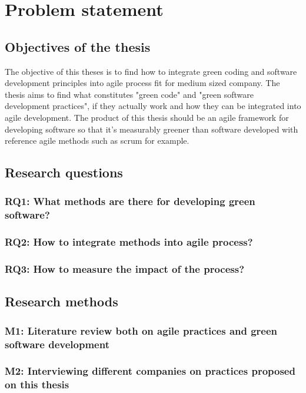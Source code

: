 \section{Problem statement}
\subsection{Objectives of the thesis}
The objective of this theses is to find how to integrate green coding and software development principles into agile process fit for medium sized company. The thesis aims to find what constitutes "green code" and "green software development practices", if they actually work and how they can be integrated into agile development. The product of this thesis should be an agile framework for developing software so that it's measurably greener than software developed with reference agile methods such as scrum for example. 

\subsection{Research questions}
\subsubsection{RQ1: What methods are there for developing green software?}
\subsubsection{RQ2: How to integrate methods into agile process?}
\subsubsection{RQ3: How to measure the impact of the process?}

\subsection{Research methods}
\subsubsection{M1: Literature review both on agile practices and green software development}
\subsubsection{M2: Interviewing different companies on practices proposed on this thesis}

\clearpage

